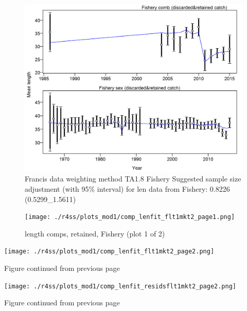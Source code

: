 \documentclass[12pt,]{article}
\begin{document}
\begin{figure}
\centering
\includegraphics{./r4ss/plots_mod1/comp_lenfit_data_weighting_TA1.8_Fishery.png}
\caption{Francis data weighting method TA1.8 Fishery Suggested sample
size adjustment (with 95\% interval) for len data from Fishery: 0.8226
(0.5299\_1.5611)
\label{fig:mod1_4_comp_lenfit_data_weighting_TA1.8_Fishery}}
\end{figure}

\begin{figure}
\centering
\texttt{[image: ./r4ss/plots\_mod1/comp\_lenfit\_flt1mkt2\_page1.png]}
\caption{length comps, retained, Fishery (plot 1 of 2)
\label{fig:mod1_5_comp_lenfit_flt1mkt2_page1}}
\end{figure}

\texttt{[image: ./r4ss/plots\_mod1/comp\_lenfit\_flt1mkt2\_page2.png]}

\begin{center} 

        Figure continued from previous page 

        \end{center}

\texttt{[image: ./r4ss/plots\_mod1/comp\_lenfit\_residsflt1mkt2\_page2.png]}

\begin{center} 

        Figure continued from previous page 

        \end{center}
\end{document}

